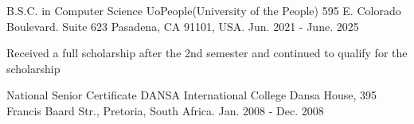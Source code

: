 

\begin{cventries}

  \cventry
    {B.S.C. in Computer Science} %
    {UoPeople(University of the People)} %
    {595 E. Colorado Boulevard. Suite 623 Pasadena, CA 91101, USA.}%
    {Jun. 2021 - June. 2025} %
    {
      \begin{cvitems} %
        \item {Received a full scholarship after the 2nd semester and continued to qualify for the scholarship}
      \end{cvitems}
    }
    
    \cventry
    {National Senior Certificate} %
    {DANSA International College} %
    {Dansa House, 395 Francis Baard Str., Pretoria, South Africa.}%
    {Jan. 2008 - Dec. 2008} %
    {
    }

\end{cventries}
